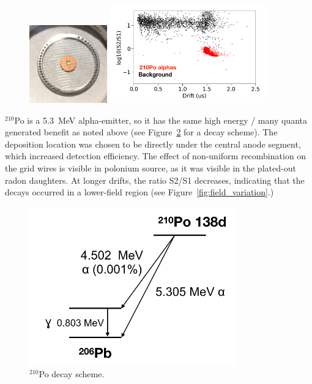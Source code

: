 \begin{figure}[htbp]
\begin{center}
\includegraphics[width=0.3\textwidth]{figures/etrains/po_on_wires.png}
\includegraphics[width=0.6\textwidth]{figures/etrains/po_drift.png}
\caption{}
\label{fig:polonium}
\end{center}
\end{figure}


$^{210}$Po is a 5.3~MeV alpha-emitter, so it has the same high energy / many quanta generated benefit as noted above (see Figure~\ref{fig:po_decay} for a decay scheme). The deposition location was chosen to be directly under the central anode segment, which increased detection efficiency. The effect of non-uniform recombination on the grid wires is visible in polonium source, as it was visible in the plated-out radon daughters. At longer drifts, the ratio S2/S1 decreases, indicating that the decays occurred in a lower-field region (see Figure~\ref{fig:field_variation}.)

\begin{figure}[htbp]
\begin{center}
\includegraphics[width=0.8\textwidth]{figures/etrains/po_decay.png}
\caption{$^{210}$Po decay scheme. }
\label{fig:po_decay}
\end{center}
\end{figure}

